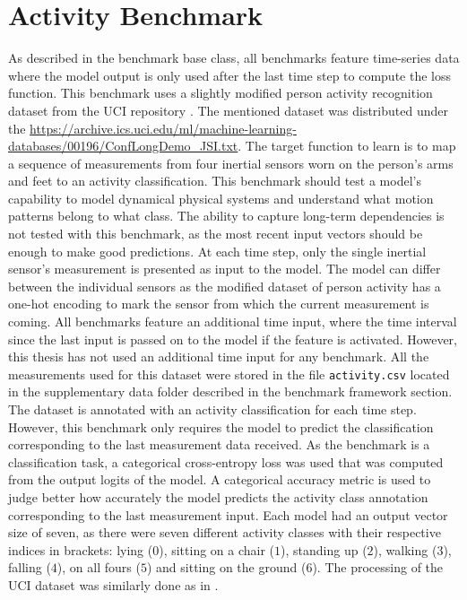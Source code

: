 \documentclass[draft,final]{vutinfth} %
\begin{document}
\section{Activity Benchmark} \label{activity}
As described in the benchmark base class, all benchmarks feature time-series data where the model output is only used after the last time step to compute the loss function.
This benchmark uses a slightly modified person activity recognition dataset from the UCI repository \cite{UCI}.
The mentioned dataset was distributed under the \url{https://archive.ics.uci.edu/ml/machine-learning-databases/00196/ConfLongDemo_JSI.txt}.
The target function to learn is to map a sequence of measurements from four inertial sensors worn on the person's arms and feet to an activity classification.
This benchmark should test a model's capability to model dynamical physical systems and understand what motion patterns belong to what class.
The ability to capture long-term dependencies is not tested with this benchmark, as the most recent input vectors should be enough to make good predictions.
At each time step, only the single inertial sensor's measurement is presented as input to the model.
The model can differ between the individual sensors as the modified dataset of person activity has a one-hot encoding to mark the sensor from which the current measurement is coming.
All benchmarks feature an additional time input, where the time interval since the last input is passed on to the model if the feature is activated.
However, this thesis has not used an additional time input for any benchmark.
All the measurements used for this dataset were stored in the file \texttt{activity.csv} located in the supplementary data folder described in the benchmark framework section.
The dataset is annotated with an activity classification for each time step. However, this benchmark only requires the model to predict the classification corresponding to the last measurement data received.
As the benchmark is a classification task, a categorical cross-entropy loss was used that was computed from the output logits of the model.
A categorical accuracy metric is used to judge better how accurately the model predicts the activity class annotation corresponding to the last measurement input.
Each model had an output vector size of seven, as there were seven different activity classes with their respective indices in brackets: lying ($0$), sitting on a chair ($1$), standing up ($2$), walking ($3$), falling ($4$), on all fours ($5$) and sitting on the ground ($6$).
The processing of the UCI dataset was similarly done as in \cite{ODELSTM}.
\end{document}
